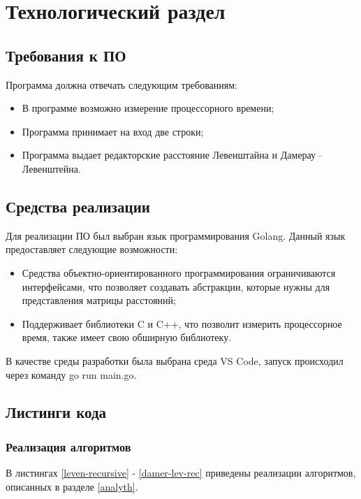 \chapter{Технологический раздел}

\section{Требования к ПО}
Программа должна отвечать следующим требованиям:
\begin{itemize}
	\item В программе возможно измерение процессорного времени;
	\item Программа принимает на вход две строки;
	\item Программа выдает редакторские расстояние Левенштайна и Дамерау\,--\,Левенштейна. 
\end{itemize}
\section{Средства реализации}
Для реализации ПО был выбран язык программирования Golang\cite{golang}. Данный язык предоставляет следующие возможности:
\begin{itemize} 
	\item Средства объектно-ориентированного программирования ограничиваются интерфейсами, что позволяет создавать абстракции, которые нужны для представления матрицы расстояний;
	\item Поддерживает библиотеки C и C++, что позволит измерить процессорное время, также имеет свою обширную библиотеку.
\end{itemize}

В качестве среды разработки была выбрана среда VS Code\cite{rune}, запуск происходил через команду go run main.go.

\section{Листинги кода}
\subsection{Реализация алгоритмов}



В листингах \ref{leven-recursive} - \ref{damer-lev-rec} приведены реализации алгоритмов, описанных в разделе \ref{analyth}.


